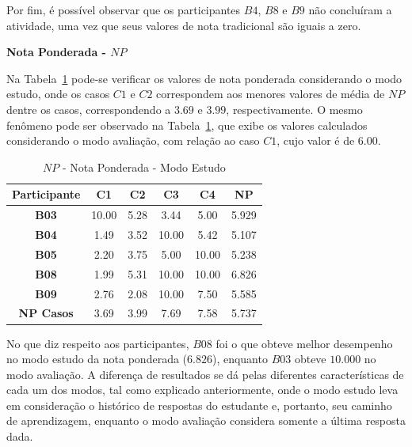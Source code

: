 Por fim, é possível observar que os participantes $B4$, $B8$ e $B9$ não concluíram a atividade, uma vez que seus valores de nota tradicional são iguais a zero.

\textbf{Nota Ponderada - $NP$}

Na Tabela~\ref{tab:F3_A5_NP_ESTUDO} pode-se verificar os valores de nota ponderada considerando o modo estudo, onde os casos $C1$ e $C2$ correspondem aos menores valores de média de $NP$ dentre os casos, correspondendo a $3.69$ e $3.99$, respectivamente. O mesmo fenômeno pode ser observado na Tabela~\ref{tab:F3_A5_NP_ESTUDO}, que exibe os valores calculados considerando o modo avaliação, com relação ao caso $C1$, cujo valor é de $6.00$.

\begin{table}[htbp]
	\centering
	\caption{$NP$ - Nota Ponderada - Modo Estudo}
	\begin{tabular}{|c|c|c|c|c|c|}
		\hline
		\rowcolor[HTML]{D9D9D9} 
		\textbf{Participante} & \textbf{C1} & \textbf{C2} & \textbf{C3} & \textbf{C4} & \textbf{NP} \\ \hline
		\rowcolor[HTML]{FFFFFF} 
		\textbf{B03} & 10.00 & 5.28 & 3.44 & 5.00 & 5.929 \\ \hline
		\rowcolor[HTML]{E7E6E6} 
		\textbf{B04} & 1.49 & 3.52 & 10.00 & 5.42 & 5.107 \\ \hline
		\rowcolor[HTML]{FFFFFF} 
		\textbf{B05} & 2.20 & 3.75 & 5.00 & 10.00 & 5.238 \\ \hline
		\rowcolor[HTML]{E7E6E6} 
		\textbf{B08} & 1.99 & 5.31 & 10.00 & 10.00 & 6.826 \\ \hline
		\rowcolor[HTML]{FFFFFF} 
		\textbf{B09} & 2.76 & 2.08 & 10.00 & 7.50 & 5.585 \\ \hline
		\rowcolor[HTML]{D9D9D9} 
		\textbf{NP Casos} & 3.69 & 3.99 & 7.69 & 7.58 & 5.737 \\ \hline
	\end{tabular}
	\label{tab:F3_A5_NP_ESTUDO}
\end{table}

No que diz respeito aos participantes, $B08$ foi o que obteve melhor desempenho no modo estudo da nota ponderada ($6.826$), enquanto $B03$ obteve $10.000$ no modo avaliação. A diferença de resultados se dá pelas diferentes características de cada um dos modos, tal como explicado anteriormente, onde o modo estudo leva em consideração o histórico de respostas do estudante e, portanto, seu caminho de aprendizagem, enquanto o modo avaliação considera somente a última resposta dada.


